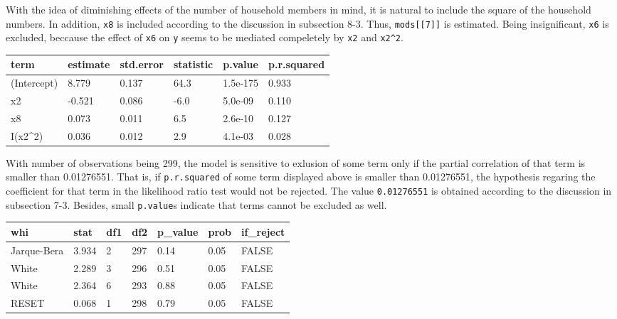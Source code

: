 \documentclass[main.tex]{subfiles}
\begin{document}
With the idea of diminishing effects of the number of household members
in mind, it is natural to include the square of the household numbers.
In addition, \texttt{x8} is included according to the discussion in
subsection 8-3. Thus, \texttt{mods{[}{[}7{]}{]}} is estimated. Being
insignificant, \texttt{x6} is excluded, beccause the effect of
\texttt{x6} on \texttt{y} seems to be mediated compeletely by
\texttt{x2} and \texttt{x2\^{}2}.

\begin{table}[H]
\centering
\begin{tabular}{llllll}
\toprule
term & estimate & std.error & statistic & p.value & p.r.squared\\
\midrule
(Intercept) & 8.779 & 0.137 & 64.3 & 1.5e-175 & 0.933\\
x2 & -0.521 & 0.086 & -6.0 & 5.0e-09 & 0.110\\
x8 & 0.073 & 0.011 & 6.5 & 2.6e-10 & 0.127\\
I(x2\textasciicircum{}2) & 0.036 & 0.012 & 2.9 & 4.1e-03 & 0.028\\
\bottomrule
\end{tabular}
\end{table}

With number of observations being 299, the model is sensitive to
exlusion of some term only if the partial correlation of that term is
smaller than 0.01276551. That is, if \texttt{p.r.squared} of some term
displayed above is smaller than 0.01276551, the hypothesis regaring the
coefficient for that term in the likelihood ratio test would not be
rejected. The value \texttt{0.01276551} is obtained according to the
discussion in subsection 7-3. Besides, small \texttt{p.value}s indicate
that terms cannot be excluded as well.

\begin{table}[H]
\centering
\begin{tabular}{lllllll}
\toprule
whi & stat & df1 & df2 & p\_value & prob & if\_reject\\
\midrule
Jarque-Bera & 3.934 & 2 & 297 & 0.14 & 0.05 & FALSE\\
White & 2.289 & 3 & 296 & 0.51 & 0.05 & FALSE\\
White & 2.364 & 6 & 293 & 0.88 & 0.05 & FALSE\\
RESET & 0.068 & 1 & 298 & 0.79 & 0.05 & FALSE\\
\bottomrule
\end{tabular}
\end{table}
\end{document}
